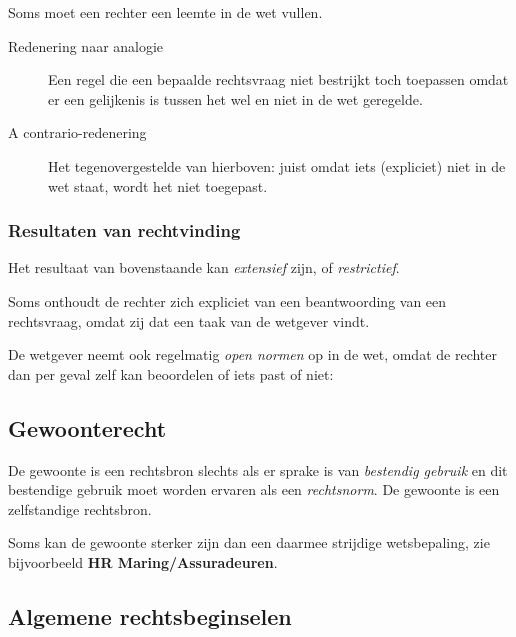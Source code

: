 \documentclass{article}
\begin{document}
Soms moet een rechter een leemte in de wet vullen.

\begin{description}
  \item[Redenering naar analogie] Een regel die een bepaalde rechtsvraag niet
    bestrijkt toch toepassen omdat er een gelijkenis is tussen het wel en niet
    in de wet geregelde.
  \item[A contrario-redenering] Het tegenovergestelde van hierboven: juist omdat
    iets (expliciet) niet in de wet staat, wordt het niet toegepast.
\end{description}

\subsubsection{Resultaten van rechtvinding}

Het resultaat van bovenstaande kan \emph{extensief} zijn, of \emph{restrictief}.

Soms onthoudt de rechter zich expliciet van een beantwoording van een
rechtsvraag, omdat zij dat een taak van de wetgever vindt.

De wetgever neemt ook regelmatig \emph{open normen} op in de wet, omdat de
rechter dan per geval zelf kan beoordelen of iets past of niet:

\subsection{Gewoonterecht}

De gewoonte is een rechtsbron slechts als er sprake is van \emph{bestendig
gebruik} en dit bestendige gebruik moet worden ervaren als een
\emph{rechtsnorm}. De gewoonte is een zelfstandige rechtsbron.

Soms kan de gewoonte sterker zijn dan een daarmee strijdige wetsbepaling, zie
bijvoorbeeld \textbf{HR Maring/Assuradeuren}.

\subsection{Algemene rechtsbeginselen}
\end{document}
